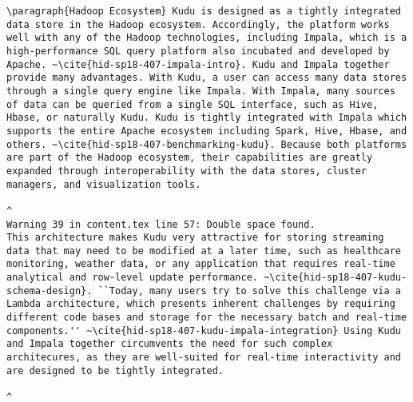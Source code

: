 \begin{tiny}
\begin{verbatim}
\paragraph{Hadoop Ecosystem} Kudu is designed as a tightly integrated data store in the Hadoop ecosystem. Accordingly, the platform works well with any of the Hadoop technologies, including Impala, which is a high-performance SQL query platform also incubated and developed by Apache. ~\cite{hid-sp18-407-impala-intro}. Kudu and Impala together provide many advantages. With Kudu, a user can access many data stores through a single query engine like Impala. With Impala, many sources of data can be queried from a single SQL interface, such as Hive, Hbase, or naturally Kudu. Kudu is tightly integrated with Impala which supports the entire Apache ecosystem including Spark, Hive, Hbase, and others. ~\cite{hid-sp18-407-benchmarking-kudu}. Because both platforms are part of the Hadoop ecosystem, their capabilities are greatly expanded through interoperability with the data stores, cluster managers, and visualization tools.  
                                                                                                                                                                                                                                                                                                                                                                                                                                                                                                                                                                                                                                                                                                                            ^
Warning 39 in content.tex line 57: Double space found.
This architecture makes Kudu very attractive for storing streaming data that may need to be modified at a later time, such as healthcare monitoring, weather data, or any application that requires real-time analytical and row-level update performance. ~\cite{hid-sp18-407-kudu-schema-design}. ``Today, many users try to solve this challenge via a Lambda architecture, which presents inherent challenges by requiring different code bases and storage for the necessary batch and real-time components.'' ~\cite{hid-sp18-407-kudu-impala-integration} Using Kudu and Impala together circumvents the need for such complex architecures, as they are well-suited for real-time interactivity and are designed to be tightly integrated.  
                                                                                                                                                                                                                                                          ^

\end{verbatim}
\end{tiny}
